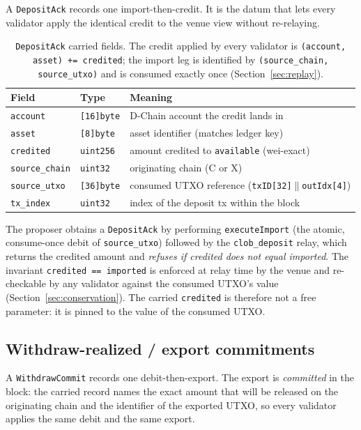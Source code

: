 A \texttt{DepositAck} records one import-then-credit. It is the datum
that lets every validator apply the identical credit to the venue
view without re-relaying.

\begin{table}[h]
\centering
\small
\begin{tabular}{@{}lll@{}}
\toprule
\textbf{Field} & \textbf{Type} & \textbf{Meaning} \\
\midrule
\texttt{account}      & \texttt{[16]byte} & D-Chain account the credit lands in \\
\texttt{asset}        & \texttt{[8]byte}  & asset identifier (matches ledger key) \\
\texttt{credited}     & \texttt{uint256}  & amount credited to \texttt{available} (wei-exact) \\
\texttt{source\_chain}& \texttt{uint32}   & originating chain (C or X) \\
\texttt{source\_utxo} & \texttt{[36]byte} & consumed UTXO reference (\texttt{txID[32]}$\|$\texttt{outIdx[4]}) \\
\texttt{tx\_index}    & \texttt{uint32}   & index of the deposit tx within the block \\
\bottomrule
\end{tabular}
\caption{\texttt{DepositAck} carried fields. The credit applied by
every validator is \texttt{(account, asset) += credited}; the import
leg is identified by \texttt{(source\_chain, source\_utxo)} and is
consumed exactly once (Section~\ref{sec:replay}).}
\label{tab:depositack}
\end{table}

The proposer obtains a \texttt{DepositAck} by performing
\texttt{executeImport} (the atomic, consume-once debit of
\texttt{source\_utxo}) followed by the \texttt{clob\_deposit} relay,
which returns the credited amount and \emph{refuses if credited does
not equal imported}. The invariant \texttt{credited == imported} is
enforced at relay time by the venue and re-checkable by any validator
against the consumed UTXO's value (Section~\ref{sec:conservation}). The
carried \texttt{credited} is therefore not a free parameter: it is
pinned to the value of the consumed UTXO.

\subsection{Withdraw-realized / export commitments}

A \texttt{WithdrawCommit} records one debit-then-export. The export is
\emph{committed} in the block: the carried record names the exact
amount that will be released on the originating chain and the
identifier of the exported UTXO, so every validator applies the same
debit and the same export.

